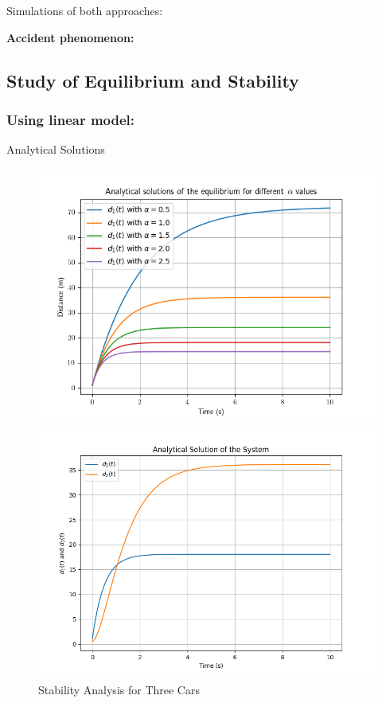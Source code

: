 \documentclass{beamer}
\begin{document}
\begin{frame}{Simulations of both approaches:}
\begin{center}
    \textbf{Accident phenomenon:}
\end{center}
\end{frame}
\subsection{Study of Equilibrium and Stability}
\subsubsection{Using linear model:}
\begin{frame}{Analytical Solutions}
	\begin{figure}[H]
		\centering
		\begin{minipage}[t]{0.49\linewidth}
			\centering
			\includegraphics[width=\linewidth]{Stability.png}
			\caption{Stability Analysis for Three Cars}
			\label{fig:StabilityAnalysis}
		\end{minipage}
		\begin{minipage}[t]{0.49\linewidth}
			\centering
			\includegraphics[width=\linewidth]{AnalyticalSolution.png}

\end{minipage}
\end{figure}
\end{frame}
\end{document}
